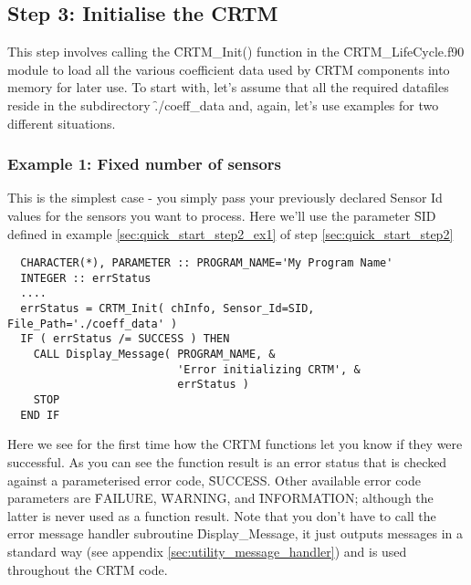 \subsection{Step 3: Initialise the CRTM}
This step involves calling the \f{CRTM\_Init()} function in the \f{CRTM\_LifeCycle.f90} module to load all the various coefficient data used by CRTM components into memory for later use. To start with, let's assume that all the required datafiles reside in the subdirectory \f{./coeff\_data} and, again, let's use examples for two different situations.
 
\subsubsection{Example 1: Fixed number of sensors}
This is the simplest case - you simply pass your previously declared Sensor Id values for the sensors you want to process. Here we'll use the parameter \f{SID} defined in example \ref{sec:quick_start_step2_ex1} of step \ref{sec:quick_start_step2}
\begin{ttfamily}
  \begin{verbatim}
  CHARACTER(*), PARAMETER :: PROGRAM_NAME='My Program Name'
  INTEGER :: errStatus
  ....
  errStatus = CRTM_Init( chInfo, Sensor_Id=SID, File_Path='./coeff_data' )
  IF ( errStatus /= SUCCESS ) THEN 
    CALL Display_Message( PROGRAM_NAME, &
                          'Error initializing CRTM', & 
                          errStatus )
    STOP
  END IF\end{verbatim}
\end{ttfamily}
Here we see for the first time how the CRTM functions let you know if they were successful. As you can see the function result is an error status that is checked against a parameterised error code, \f{SUCCESS}. Other available error code parameters are \f{FAILURE}, \f{WARNING}, and \f{INFORMATION}; although the latter is never used as a function result. Note that you don't have to call the error message handler subroutine \f{Display\_Message}, it just outputs messages in a standard way (see appendix \ref{sec:utility_message_handler}) and is used throughout the CRTM code.

